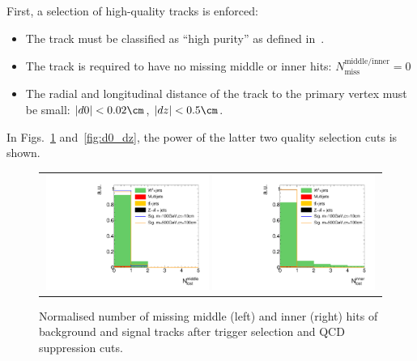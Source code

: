 First, a selection of high-quality tracks is enforced:
\begin{itemize}
\renewcommand{\labelitemi}{\footnotesize{\ding{118}}}
\item The track must be classified as ``high purity'' as defined in~\cite{bib:CMS:Tracking_2010}.
\item The track is required to have no missing middle or inner hits: $N_{\text{miss}}^{\text{middle/inner}}=0$
\item The radial and longitudinal  distance of the track to the primary vertex must be small: \mbox{$|d0|<0.02\cm$}, \mbox{$|dz|<0.5\cm$}.
\end{itemize}
In Figs.~\ref{fig:LostHits} and~\ref{fig:d0_dz}, the power of the latter two quality selection cuts is shown.\\
\begin{figure}[!b]
  \centering 
  \begin{tabular}{c}
    \includegraphics[width=0.49\textwidth]{figures/analysis/AnalysisSelection/chiTracksQCDsupressionTrigger_2Signals_FullBkg/htrackNLostMid_lin.pdf}
    \includegraphics[width=0.49\textwidth]{figures/analysis/AnalysisSelection/chiTracksQCDsupressionTrigger_2Signals_FullBkg/htrackNLostInner_lin.pdf}
  \end{tabular}
  \caption{Normalised number of missing middle (left) and inner (right) hits of background and signal tracks after trigger selection and QCD suppression cuts.}
  \label{fig:LostHits}
\end{figure}
